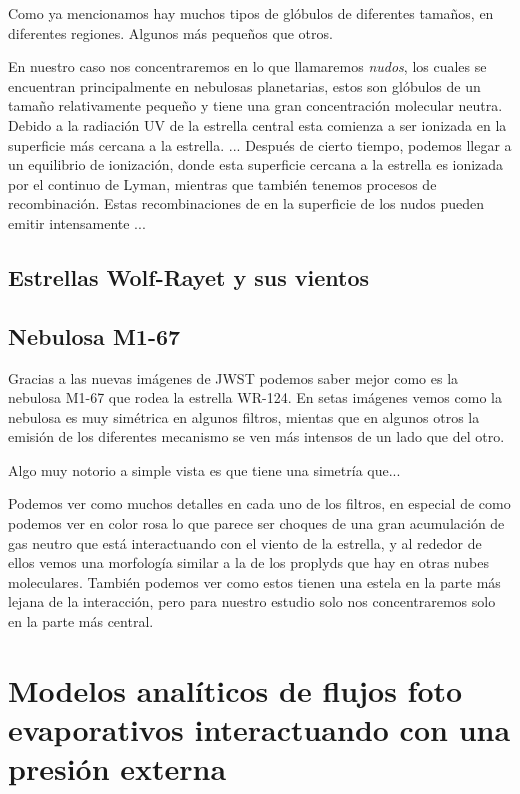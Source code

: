 \documentclass{book}
\begin{document}
Como ya mencionamos hay muchos tipos de glóbulos de diferentes tamaños, en diferentes regiones. Algunos más pequeños que otros. 

En nuestro caso nos concentraremos en lo que llamaremos \textit{nudos}, los cuales se encuentran principalmente en nebulosas planetarias, estos son glóbulos de un tamaño relativamente pequeño y tiene una gran concentración molecular neutra. Debido a la radiación UV de la estrella central esta comienza a ser ionizada en la superficie más cercana a la estrella. ...
Después de cierto tiempo, podemos llegar a un equilibrio de ionización, donde esta superficie cercana a la estrella es ionizada por el continuo de Lyman, mientras que también tenemos procesos de recombinación. Estas recombinaciones de en la superficie de los nudos pueden emitir intensamente ...

\section{Estrellas Wolf-Rayet y sus vientos}

\section{Nebulosa M1-67}

Gracias a las nuevas imágenes de JWST podemos saber mejor como es la nebulosa M1-67 que rodea la estrella WR-124. En setas imágenes vemos como la nebulosa es muy simétrica en algunos filtros, mientas que en algunos otros la emisión de los diferentes mecanismo se ven más intensos de un lado que del otro.

Algo muy notorio a simple vista es que tiene una simetría que...


Podemos ver como muchos detalles en cada uno de los filtros, en especial de como podemos ver en color rosa lo que parece ser choques de una gran acumulación de gas neutro que está interactuando con el viento de la estrella, y al rededor de ellos vemos una morfología similar a la de los proplyds que hay en otras nubes moleculares. También podemos ver como estos tienen una estela en la parte más lejana de la interacción, pero para nuestro estudio solo nos concentraremos solo en la parte más central.

\chapter{Modelos analíticos de flujos foto evaporativos interactuando con una presión externa}
\end{document}
